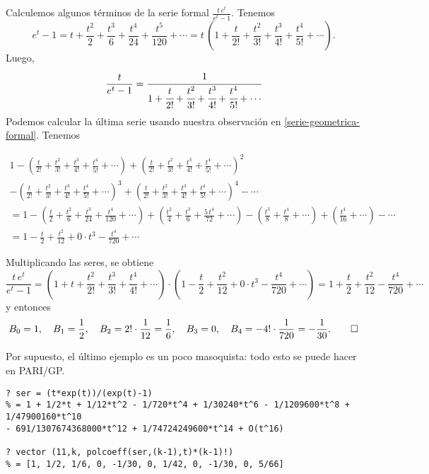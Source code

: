 \documentclass{article}
\numberwithin{equation}{section}
\theoremstyle{definition}
\begin{document}
\begin{ejemplo}
  \label{calculo-masoquista}
  Calculemos algunos términos de la serie formal
  $\frac{t\,e^t}{e^t - 1}$. Tenemos
  $$e^t - 1 = t + \frac{t^2}{2} + \frac{t^3}{6} + \frac{t^4}{24} + \frac{t^5}{120} + \cdots =
  t\,\left(1 + \frac{t}{2!} + \frac{t^2}{3!} + \frac{t^3}{4!} + \frac{t^4}{5!} + \cdots\right).$$
  Luego,
  $$\frac{t}{e^t - 1} = \cfrac{1}{1 + \cfrac{t}{2!} + \cfrac{t^2}{3!} + \cfrac{t^3}{4!} + \cfrac{t^4}{5!} + \cdots}$$
  Podemos calcular la última serie usando nuestra observación en
  \ref{serie-geometrica-formal}. Tenemos

  \begin{multline*}
    1 -
    \left(\frac{t}{2!} + \frac{t^2}{3!} + \frac{t^3}{4!} + \frac{t^4}{5!} + \cdots\right) +
    \left(\frac{t}{2!} + \frac{t^2}{3!} + \frac{t^3}{4!} + \frac{t^4}{5!} + \cdots\right)^2\\
    - \left(\frac{t}{2!} + \frac{t^2}{3!} + \frac{t^3}{4!} + \frac{t^4}{5!} + \cdots\right)^3 +
    \left(\frac{t}{2!} + \frac{t^2}{3!} + \frac{t^3}{4!} + \frac{t^4}{5!} + \cdots\right)^4 - \cdots\\
    = 1 -
    \left(\frac{t}{2} + \frac{t^2}{6} + \frac{t^3}{24} + \frac{t^4}{120} + \cdots\right) +
    \left(\frac{t^2}{4} + \frac{t^3}{6} + \frac{5\,t^4}{72} + \cdots\right) - \left(\frac{t^3}{8} + \frac{t^4}{8} + \cdots\right) + \left(\frac{t^4}{16} + \cdots\right) - \cdots \\
    = 1 - \frac{t}{2} + \frac{t^2}{12} + 0\cdot t^3 - \frac{t^4}{720} + \cdots
  \end{multline*}

  Multiplicando las seres, se obtiene
  $$\frac{t\,e^t}{e^t - 1} =
  \left(1 + t + \frac{t^2}{2!} + \frac{t^3}{3!} + \frac{t^4}{4!} + \cdots\right) \cdot \left(1 - \frac{t}{2} + \frac{t^2}{12} + 0\cdot t^3 - \frac{t^4}{720} + \cdots\right) =
  1 + \frac{t}{2} + \frac{t^2}{12} - \frac{t^4}{720} + \cdots$$
  y entonces
  \[ B_0 = 1, \quad
    B_1 = \frac{1}{2}, \quad
    B_2 = 2! \cdot \frac{1}{12} = \frac{1}{6}, \quad
    B_3 = 0, \quad
    B_4 = -4!\cdot\frac{1}{720} = -\frac{1}{30}. \qedhere \]
\end{ejemplo}

\begin{shaded}
  \small\noindent Por supuesto, el último ejemplo es un poco masoquista: todo
  esto se puede hacer en PARI/GP.

\begin{verbatim}
? ser = (t*exp(t))/(exp(t)-1)
% = 1 + 1/2*t + 1/12*t^2 - 1/720*t^4 + 1/30240*t^6 - 1/1209600*t^8 + 1/47900160*t^10
- 691/1307674368000*t^12 + 1/74724249600*t^14 + O(t^16)

? vector (11,k, polcoeff(ser,(k-1),t)*(k-1)!)
% = [1, 1/2, 1/6, 0, -1/30, 0, 1/42, 0, -1/30, 0, 5/66]
\end{verbatim}
\end{shaded}
\end{document}
